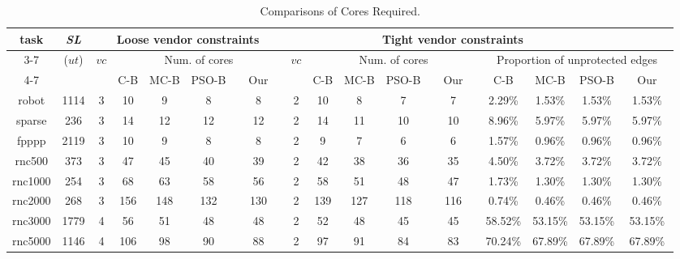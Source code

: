 \documentclass[10pt,journal, compsoc]{IEEEtran}
\begin{document}
\begin{table}[t]
\renewcommand{\arraystretch}{1.1}
\caption{Comparisons of Cores Required.}
\centering
\begin{tabular}{c|c|ccccc|ccccccccc}
\hline
\hline
\multicolumn{1}{c|}{\multirow{2}{*}{task}}        &\multicolumn{1}{c|}{\multirow{2}{*}{\textit{SL}}}           & \multicolumn{5}{c|}{Loose vendor constraints}        & \multicolumn{8}{c}{Tight vendor constraints}         \\  \cline{3-7} \cline{8-16}

\multicolumn{1}{c|}{\multirow{2}{*}{graph}}       &\multicolumn{1}{c|}{\multirow{2}{*}{($ut$)}}     &\multicolumn{1}{c}{\multirow{2}{*}{$vc$}}   & \multicolumn{4}{|c|}{Num. of cores}  &\multicolumn{1}{c}{\multirow{2}{*}{$vc$}}   & \multicolumn{4}{|c}{Num. of cores}    & \multicolumn{4}{|c}{Proportion of unprotected edges}    \\ \cline{4-7} \cline{9-12}  \cline{13-16}

                           &    &    & \multicolumn{1}{|c}{\multirow{1}{*}{C-B}}         &MC-B  &PSO-B   &~~Our~~  &     &\multicolumn{1}{|c}{\multirow{1}{*}{C-B }}        &MC-B    &PSO-B &~~Our~~    &\multicolumn{1}{|c}{\multirow{1}{*}{C-B}}        &MC-B  &PSO-B   &~~Our~~     \\
\hline
\hline

robot              &1114  &3 &10 &9 &8 &8        &2     &10     &8  &7   &7       &2.29\%     &1.53\%   &1.53\%  &1.53\%  \\

sparse              &236  &3  &14 &12 &12 &12     &2     &14     &11  &10   &10     &8.96\%     &5.97\%   &5.97\%  &5.97\%  \\

fpppp              &2119  &3   &10 &9 &8 &8      &2     &9     &7   &6  &6      &1.57\%     &0.96\%   &0.96\%  &0.96\% \\

rnc500            &373    &3  &47 &45 &40 &39     &2     &42     &38   &36  &35      &4.50\%     &3.72\%  &3.72\%   &3.72\% \\

rnc1000            &254   &3   &68 &63 &58 &56    &2     &58     &51   &48  &47       &1.73\%     &1.30\%   &1.30\%  &1.30\%  \\

rnc2000           &268    &3  &156 &148 &132 &130     &2     &139     &127  &118   &116     &0.74\%     &0.46\%   &0.46\%  &0.46\% \\

rnc3000           &1779   &4   &56 &51 &48 &48       &2     &52     &48   &45  &45     &58.52\%     &53.15\%   &53.15\%  &53.15\% \\

rnc5000           &1146   &4   &106 &98 &90 &88      &2     &97     &91   &84  &83     &70.24\%     &67.89\%  &67.89\%   &67.89\%  \\

\hline
\hline
\end{tabular}
\label{table:core_usage}
\end{table}
\end{document}
